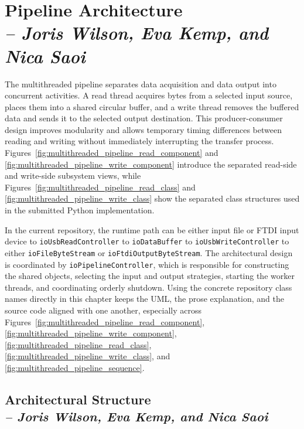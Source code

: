 \section{Pipeline Architecture \\
\small{\textit{-- Joris Wilson, Eva Kemp, and Nica Saoi}}}
\label{Section::Pipeline Architecture}

The multithreaded pipeline separates data acquisition and data output into concurrent activities. A read thread acquires bytes from a selected input source, places them into a shared circular buffer, and a write thread removes the buffered data and sends it to the selected output destination. This producer-consumer design improves modularity and allows temporary timing differences between reading and writing without immediately interrupting the transfer process. Figures~\ref{fig:multithreaded_pipeline_read_component} and \ref{fig:multithreaded_pipeline_write_component} introduce the separated read-side and write-side subsystem views, while Figures~\ref{fig:multithreaded_pipeline_read_class} and \ref{fig:multithreaded_pipeline_write_class} show the separated class structures used in the submitted Python implementation.

In the current repository, the runtime path can be either input file or FTDI input device to \texttt{ioUsbReadController} to \texttt{ioDataBuffer} to \texttt{ioUsbWriteController} to either \texttt{ioFileByteStream} or \texttt{ioFtdiOutputByteStream}. The architectural design is coordinated by \texttt{ioPipelineController}, which is responsible for constructing the shared objects, selecting the input and output strategies, starting the worker threads, and coordinating orderly shutdown. Using the concrete repository class names directly in this chapter keeps the UML, the prose explanation, and the source code aligned with one another, especially across Figures~\ref{fig:multithreaded_pipeline_read_component}, \ref{fig:multithreaded_pipeline_write_component}, \ref{fig:multithreaded_pipeline_read_class}, \ref{fig:multithreaded_pipeline_write_class}, and \ref{fig:multithreaded_pipeline_sequence}.

\subsection{Architectural Structure \\
\small{\textit{-- Joris Wilson, Eva Kemp, and Nica Saoi}}}
\label{Section::Architectural Structure}

